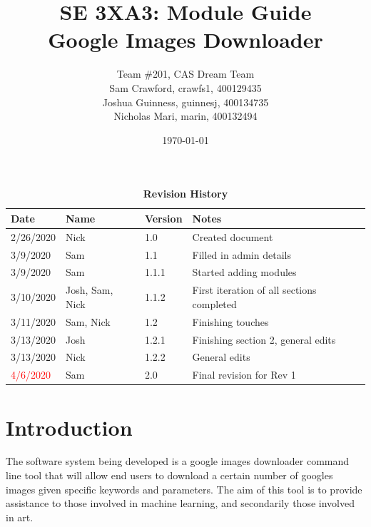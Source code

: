 \documentclass[12pt, titlepage]{article}
\title{SE 3XA3: Module Guide\\Google Images Downloader}
\author{Team \#201, CAS Dream Team
		\\ Sam Crawford, crawfs1, 400129435
		\\ Joshua Guinness, guinnesj, 400134735
		\\ Nicholas Mari, marin, 400132494
}
\date{\today}
\begin{document}
\maketitle

\tableofcontents
\listoftables
\listoffigures

\begin{table}[tp]
\begin{tabularx}{\textwidth}{llll}
\toprule {\bf Date} & {\bf Name} & {\bf Version} & {\bf Notes}\\
\midrule
2/26/2020 & Nick & 1.0 & Created document\\
3/9/2020 & Sam & 1.1 & Filled in admin details\\
3/9/2020 & Sam & 1.1.1 & Started adding modules\\
3/10/2020 & Josh, Sam, Nick & 1.1.2 & First iteration of all sections completed\\
3/11/2020 & Sam, Nick & 1.2 & Finishing touches\\
3/13/2020 & Josh & 1.2.1 & Finishing section 2, general edits\\
3/13/2020 & Nick & 1.2.2 & General edits\\
\textcolor{red}{4/6/2020} & \color{red}Sam & \color{red}2.0 & \color{red}Final revision for Rev 1\\
\bottomrule
\end{tabularx}
\caption{\bf Revision History}
\end{table}


\newpage


\section{Introduction}

The software system being developed is a google images downloader command line tool that
will allow end users to download a certain number of googles images given
specific keywords and parameters. The aim of this tool is to provide assistance to those
involved in machine learning, and secondarily those involved in art.
\end{document}
